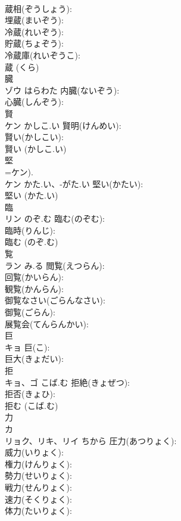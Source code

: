 \documentclass[8pt]{extreport}
\begin{document}
\begin{CJK}{UTF8}{min}
\\	蔵相(ぞうしょう): 
\\	埋蔵(まいぞう): 
\\	冷蔵(れいぞう): 
\\	貯蔵(ちょぞう): 
\\	冷蔵庫(れいぞうこ): 
\\	蔵 (くら)
\\	臓			
\\	ゾウ	はらわた	内臓(ないぞう): 
\\	心臓(しんぞう): 
\\	賢			
\\	ケン	かしこ.い	賢明(けんめい): 
\\	賢い(かしこい): 
\\	賢い (かしこ.い)
\\	堅			
\\	=ケン).	
\\	ケン	かた.い、-がた.い	堅い(かたい): 
\\	堅い (かた.い)
\\	臨			
\\	リン	のぞ.む	臨む(のぞむ): 
\\	臨時(りんじ): 
\\	臨む (のぞ.む)
\\	覧			
\\	ラン	み.る	閲覧(えつらん): 
\\	回覧(かいらん): 
\\	観覧(かんらん): 
\\	御覧なさい(ごらんなさい): 
\\	御覧(ごらん): 
\\	展覧会(てんらんかい): 
\\	巨			
\\	キョ		巨(こ): 
\\	巨大(きょだい): 
\\	拒			
\\	キョ、ゴ	こば.む	拒絶(きょぜつ): 
\\	拒否(きょひ): 
\\	拒む (こば.む)
\\	力			
\\	カ 
\\	リョク、リキ、リイ	ちから	圧力(あつりょく): 
\\	威力(いりょく): 
\\	権力(けんりょく): 
\\	勢力(せいりょく): 
\\	戦力(せんりょく): 
\\	速力(そくりょく): 
\\	体力(たいりょく): 

\end{CJK}
\end{document}
